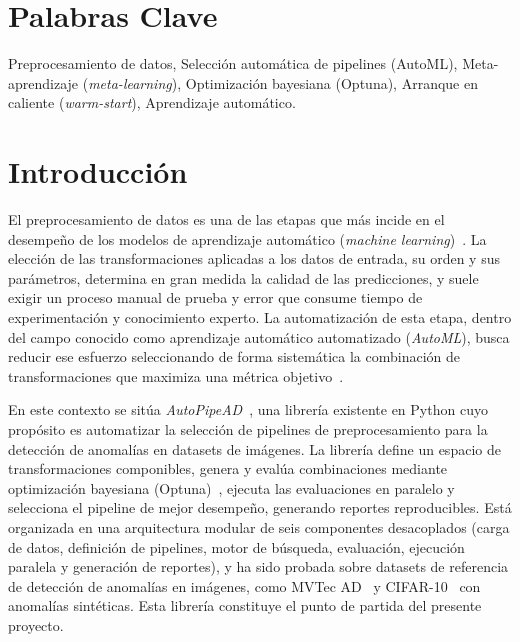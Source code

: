 \documentclass[12pt,letterpaper]{article}
\begin{document}
\section*{Palabras Clave}
Preprocesamiento de datos, Selección automática de pipelines (AutoML), Meta-aprendizaje (\textit{meta-learning}), Optimización bayesiana (Optuna), Arranque en caliente (\textit{warm-start}), Aprendizaje automático.

\newpage
{}
\setcounter{page}{1}

\section{Introducción}

El preprocesamiento de datos es una de las etapas que más incide en el desempeño de los modelos de aprendizaje automático (\textit{machine learning})~\cite{garcia2015preprocessing}. La elección de las transformaciones aplicadas a los datos de entrada, su orden y sus parámetros, determina en gran medida la calidad de las predicciones, y suele exigir un proceso manual de prueba y error que consume tiempo de experimentación y conocimiento experto. La automatización de esta etapa, dentro del campo conocido como aprendizaje automático automatizado (\textit{AutoML}), busca reducir ese esfuerzo seleccionando de forma sistemática la combinación de transformaciones que maximiza una métrica objetivo~\cite{hutter2019automl, feurer2015autosklearn}.

En este contexto se sitúa \textit{AutoPipeAD}~\cite{borbon2026autopipead}, una librería existente en Python cuyo propósito es automatizar la selección de pipelines de preprocesamiento para la detección de anomalías en datasets de imágenes. La librería define un espacio de transformaciones componibles, genera y evalúa combinaciones mediante optimización bayesiana (Optuna)~\cite{akiba2019optuna}, ejecuta las evaluaciones en paralelo y selecciona el pipeline de mejor desempeño, generando reportes reproducibles. Está organizada en una arquitectura modular de seis componentes desacoplados (carga de datos, definición de pipelines, motor de búsqueda, evaluación, ejecución paralela y generación de reportes), y ha sido probada sobre datasets de referencia de detección de anomalías en imágenes, como MVTec AD~\cite{bergmann2019mvtec} y CIFAR-10~\cite{krizhevsky2009cifar} con anomalías sintéticas. Esta librería constituye el punto de partida del presente proyecto.
\end{document}
